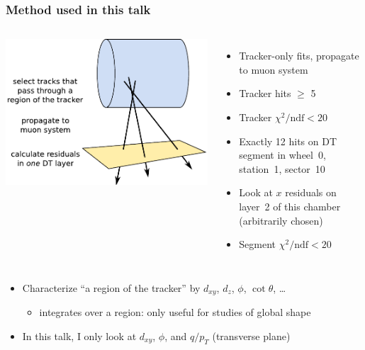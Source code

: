 \documentclass[compress]{beamer}
\begin{document}
\begin{frame}
\frametitle{Method used in this talk}

\begin{columns}
\includegraphics[width=\linewidth]{method.pdf}

\begin{itemize}
\item Tracker-only fits, propagate to muon system
\item Tracker hits $\ge$ 5
\item Tracker $\chi^2/\mbox{ndf} < 20$
\item Exactly 12 hits on DT segment in wheel~0, station~1, sector~10
\item Look at $x$ residuals on layer~2 of this chamber \\ (arbitrarily chosen)
\item Segment $\chi^2/\mbox{ndf} < 20$
\end{itemize}
\end{columns}

\begin{itemize}
\item Characterize ``a region of the tracker'' by $d_{xy}$, $d_z$, $\phi$, $\cot\theta$, \ldots
\begin{itemize}
\item integrates over a region: only useful for studies of global shape
\end{itemize}

\item In this talk, I only look at $d_{xy}$, $\phi$, and $q/p_T$ (transverse plane)
\end{itemize}
\end{frame}
\end{document}
